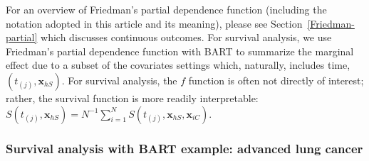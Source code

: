 \documentclass[article]{jss}
\begin{document}
For an overview of Friedman's partial dependence function (including
the notation adopted in this article and its meaning), please see 
Section~\ref{Friedman-partial} which discusses continuous outcomes.
For survival analysis, we use Friedman's partial dependence function
\citep{Frie01} with BART to summarize the marginal effect due to a
subset of the covariates settings which, naturally, includes time,
$(t_{(j)}, \bm{x}_{hS})$.
For survival analysis, the $f$ function is often not
directly of interest; rather, the survival function is more readily
interpretable:
$S(t_{(j)}, \bm{x}_{hS}) = {N^{-1}} \sum_{i=1}^N S(t_{(j)},
\bm{x}_{hS}, \bm{x}_{iC})$.

\subsubsection{Survival analysis with BART example:  
advanced lung cancer}
\end{document}
